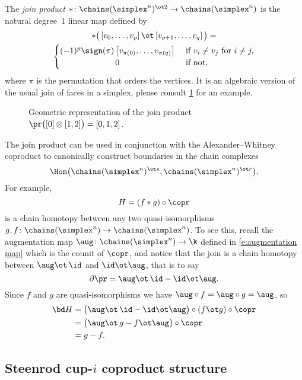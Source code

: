 The \textit{join product} $\ast \colon \chains(\simplex^n)^{\ot 2} \to \chains(\simplex^n)$ is the natural degree~$1$ linear map defined by
\begin{multline}
\ast \big(\left[v_0, \dots, v_p \right] \ot \left[v_{p+1}, \dots, v_q\right]\big) = \\
\begin{cases} (-1)^{p} \sign(\pi) \left[v_{\pi(0)}, \dots, v_{\pi(q)}\right] & \text{ if } v_i \neq v_j \text{ for } i \neq j, \\
\hfil 0 & \text{ if not}, \end{cases}
\end{multline}
where $\pi$ is the permutation that orders the vertices.
It is an algebraic version of the usual join of faces in a simplex, please consult \cref{f:join of faces} for an example.

\begin{figure}
	
	\caption{Geometric representation of the join product $\pr \big( [0] \otimes [1,2] \big) = [0,1,2]$.}
	\label{f:join of faces}
\end{figure}

The join product can be used in conjunction with the Alexander--Whitney coproduct to canonically construct boundaries in the chain complexes
\[
\Hom \big( \chains(\simplex^n)^{\ot s}, \chains(\simplex^n)^{\ot r} \big).
\]
For example,
\[
H = (f \ast g) \circ \copr
\]
is a chain homotopy between any two quasi-isomorphisms $g, f \colon \chains(\simplex^n) \to \chains(\simplex^n)$.
To see this, recall the augmentation map $\aug \colon \chains(\simplex^n) \to \k$ defined in \eqref{e:augmentation map} which is the counit of $\copr$, and notice that the join is a chain homotopy between $\aug \ot \, \id$ and $\id \ot \aug$, that is to say
\begin{equation}
\partial \pr = \aug \ot \, \id - \id \ot \aug.
\end{equation}
Since $f$ and $g$ are quasi-isomorphisms we have $\aug \circ f = \aug \circ g = \aug$, so
\begin{align*}
\bd H &=
\big( \aug \ot \, \id - \id \ot \aug \big) \circ (f \ot g) \circ \copr \\ &=
\big(\aug \ot \, g - f \ot \aug \big) \circ \copr \\ &= g - f.
\end{align*}

\subsection{Steenrod cup-$i$ coproduct structure} \label{ss:cup-i}

